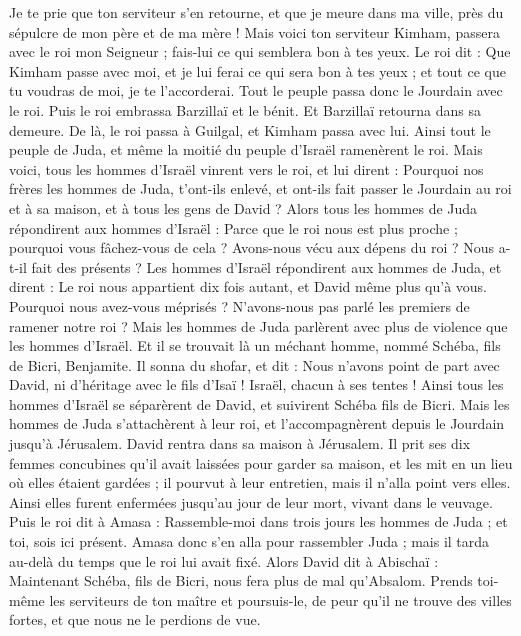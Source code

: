 \begin{multicols}{2}
Je te prie que ton serviteur s'en retourne, et que je meure dans ma ville, près du sépulcre de mon père et de ma mère ! Mais voici ton serviteur Kimham, passera avec le roi mon Seigneur ; fais-lui ce qui semblera bon à tes yeux.
Le roi dit : Que Kimham passe avec moi, et je lui ferai ce qui sera bon à tes yeux ; et tout ce que tu voudras de moi, je te l'accorderai.
Tout le peuple passa donc le Jourdain avec le roi. Puis le roi embrassa Barzillaï et le bénit. Et Barzillaï retourna dans sa demeure.
De là, le roi passa à Guilgal, et Kimham passa avec lui. Ainsi tout le peuple de Juda, et même la moitié du peuple d'Israël ramenèrent le roi.
Mais voici, tous les hommes d'Israël vinrent vers le roi, et lui dirent : Pourquoi nos frères les hommes de Juda, t'ont-ils enlevé, et ont-ils fait passer le Jourdain au roi et à sa maison, et à tous les gens de David ?
Alors tous les hommes de Juda répondirent aux hommes d'Israël : Parce que le roi nous est plus proche ; pourquoi vous fâchez-vous de cela ? Avons-nous vécu aux dépens du roi ? Nous a-t-il fait des présents ?
Les hommes d'Israël répondirent aux hommes de Juda, et dirent : Le roi nous appartient dix fois autant, et David même plus qu'à vous. Pourquoi nous avez-vous méprisés ? N'avons-nous pas parlé les premiers de ramener notre roi ? Mais les hommes de Juda parlèrent avec plus de violence que les hommes d'Israël.
\VerseOne{}Et il se trouvait là un méchant homme, nommé Schéba, fils de Bicri, Benjamite. Il sonna du shofar, et dit : Nous n'avons point de part avec David, ni d'héritage avec le fils d'Isaï ! Israël, chacun à ses tentes !
Ainsi tous les hommes d'Israël se séparèrent de David, et suivirent Schéba fils de Bicri. Mais les hommes de Juda s'attachèrent à leur roi, et l'accompagnèrent depuis le Jourdain jusqu'à Jérusalem.
David rentra dans sa maison à Jérusalem. Il prit ses dix femmes concubines qu'il avait laissées pour garder sa maison, et les mit en un lieu où elles étaient gardées ; il pourvut à leur entretien, mais il n'alla point vers elles. Ainsi elles furent enfermées jusqu'au jour de leur mort, vivant dans le veuvage.
Puis le roi dit à Amasa : Rassemble-moi dans trois jours les hommes de Juda ; et toi, sois ici présent.
Amasa donc s'en alla pour rassembler Juda ; mais il tarda au-delà du temps que le roi lui avait fixé.
Alors David dit à Abischaï : Maintenant Schéba, fils de Bicri, nous fera plus de mal qu’Absalom. Prends toi-même les serviteurs de ton maître et poursuis-le, de peur qu'il ne trouve des villes fortes, et que nous ne le perdions de vue.

\end{multicols}

